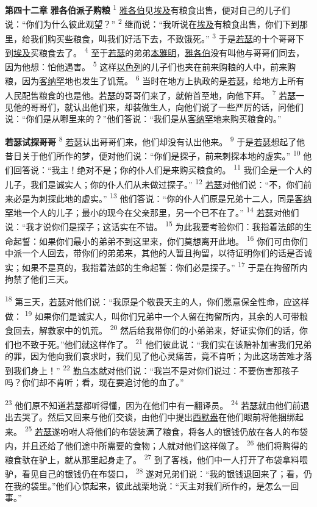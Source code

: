 \textbf{第四十二章 }
\textbf{雅各伯派子购粮 }
\textsuperscript{1}
\uline{雅各伯}见\uline{埃及}有粮食出售，便对自己的儿子们说：“你们为什么彼此观望？”
\textsuperscript{2}
继而说：“我听说在\uline{埃及}有粮食出售，你们下到那里，给我们购买些粮食，叫我们好活下去，不致饿死。”
\textsuperscript{3}
于是\uline{若瑟}的十个哥哥下到\uline{埃及}买粮食去了。
\textsuperscript{4}
至于\uline{若瑟}的弟弟\uline{本雅明}，\uline{雅各伯}没有叫他与哥哥们同去，因为他想：怕他遇害。
\textsuperscript{5}
这样\uline{以色列}的儿子们也夹在前来购粮的人中，前来购粮，因为\uline{客纳罕}地也发生了饥荒。
\textsuperscript{6}
当时在地方上执政的是\uline{若瑟}，给地方上所有人民配售粮食的也是他。\uline{若瑟}的哥哥们来了，就俯首至地，向他下拜。
\textsuperscript{7}
\uline{若瑟}一见他的哥哥们，就认出他们来，却装做生人，向他们说了一些严厉的话，问他们说：“你们是从哪里来的？”他们答说：“我们是从\uline{客纳罕}地来购买粮食的。”

\textbf{若瑟试探哥哥 }
\textsuperscript{8}
\uline{若瑟}认出哥哥们来，他们却没有认出他来。
\textsuperscript{9}
于是\uline{若瑟}想起了他昔日关于他们所作的梦，便对他们说：“你们是探子，前来刺探本地的虚实。”
\textsuperscript{10}
他们回答说：“我主！绝对不是；你的仆人们是来购买粮食的。
\textsuperscript{11}
我们全是一个人的儿子，我们是诚实人；你的仆人们从未做过探子。”
\textsuperscript{12}
\uline{若瑟}对他们说：“不，你们前来必是为刺探此地的虚实。”
\textsuperscript{13}
他们答说：“你的仆人们原是兄弟十二人，同是\uline{客纳罕}地一个人的儿子；最小的现今在父亲那里，另一个已不在了。”
\textsuperscript{14}
\uline{若瑟}对他们说：“我才说你们是探子；这话实在不错。
\textsuperscript{15}
为此我要考验你们：我指着法郎的生命起誓：如果你们最小的弟弟不到这里来，你们莫想离开此地。
\textsuperscript{16}
你们可由你们中派一个人回去，带你们的弟弟来，其他的人暂且拘留，以待证明你们的话是否诚实；如果不是真的，我指着法郎的生命起誓：你们必是探子。”
\textsuperscript{17}
于是在拘留所内拘禁了他们三天。

\textsuperscript{18}
第三天，\uline{若瑟}对他们说：“我原是个敬畏天主的人，你们愿意保全性命，应这样做：
\textsuperscript{19}
如果你们是诚实人，叫你们兄弟中一个人留在拘留所内，其余的人可带粮食回去，解救家中的饥荒。
\textsuperscript{20}
然后给我带你们的小弟弟来，好证实你们的话，你们也不致于死。”他们就这样作了。
\textsuperscript{21}
他们彼此说：“我们实在该赔补加害我们兄弟的罪，因为他向我们哀求时，我们见了他心灵痛苦，竟不肯听；为此这场苦难才落到我们身上！”
\textsuperscript{22}
\uline{勒乌本}就对他们说：“我岂不是对你们说过：不要伤害那孩子吗？你们却不肯听；看，现在要追讨他的血了。”

\textsuperscript{23}
他们原不知道\uline{若瑟}都听得懂，因为在他们中有一翻译员。
\textsuperscript{24}
\uline{若瑟}就由他们前退出去哭了。然后又回来与他们交谈，由他们中提出\uline{西默盎}在他们眼前将他捆绑起来。
\textsuperscript{25}
\uline{若瑟}遂吩咐人将他们的布袋装满了粮食，将各人的银钱仍放在各人的布袋内，并且还给了他们途中所需要的食物；人就对他们这样做了。
\textsuperscript{26}
他们将购得的粮食驮在驴上，就从那里起身走了。
\textsuperscript{27}
到了客栈，他们中一人打开了布袋拿料喂驴，看见自己的银钱仍在布袋口，
\textsuperscript{28}
遂对兄弟们说：“我的银钱退回来了；看，仍在我的袋里。”他们心惊起来，彼此战栗地说：“天主对我们所作的，是怎么一回事。”

